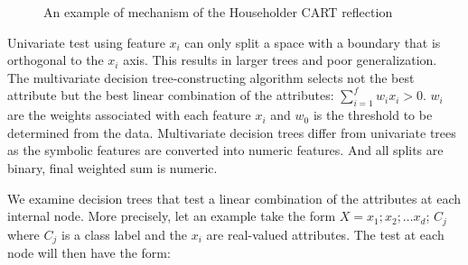 \documentclass[12pt,preprint]{elsarticle}
\begin{document}
\begin{figure}[h]
\begin{center}
\caption{An example of mechanism of the Householder CART reflection}
\label{figMatrices}
\end{center}
\end{figure}

Univariate test using feature $x_i$ can only split a space with a boundary that is orthogonal to the $x_i$ axis. This results in larger trees and poor generalization.  The  multivariate  decision  tree-constructing algorithm selects not the best attribute but the best linear  combination of the attributes: $\sum_{i=1}^f w_i x_i>0$. $w_i$ are the weights associated with each feature  $x_i$ and  $w_0$ is the threshold to be determined from the data. Multivariate decision trees  differ from  univariate trees  as the  symbolic  features  are  converted  into  numeric  features. And all splits are binary, final weighted sum is numeric.



We examine decision trees that test a linear combination of the attributes
at each internal node. More precisely, let an example take the form $X = x_1; x_2; \dots x_d$; $C_j$
where $C_j$ is a class label and the $x_i$ are real-valued attributes. The test at each node will
then have the form:
\end{document}
